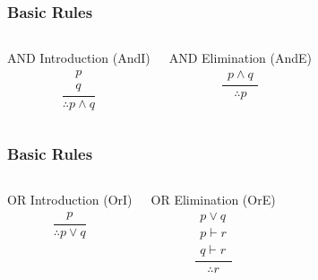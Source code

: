 \documentclass[dvipsnames]{beamer}
\begin{document}
\begin{frame}
  \frametitle{Basic Rules}

  \begin{columns}[t]
    \begin{block}{AND Introduction (AndI)}
      \[
      \frac
        {
          \begin{array}{c}
            p\\
            q
          \end{array}
        }
        {
          \therefore p \wedge q
        }
      \]
    \end{block}

    \pause
    \begin{block}{AND Elimination (AndE)}
    \[
    \frac
      {
        \begin{array}{c}
          p \wedge q
        \end{array}
      }
      {
        \therefore p
      }
    \]
    \end{block}
  \end{columns}
\end{frame}

\begin{frame}
  \frametitle{Basic Rules}

  \begin{columns}[t]
    \begin{block}{OR Introduction (OrI)}
      \[
      \frac
        {
          \begin{array}{c}
            p
          \end{array}
        }
        {
          \therefore p \vee q
        }
      \]
    \end{block}

    \pause
    \begin{block}{OR Elimination (OrE)}
    \[
    \frac
      {
        \begin{array}{c}
          p \vee q\\
          p \vdash r\\
          q \vdash r
        \end{array}
      }
      {
        \therefore r
      }
    \]
    \end{block}
  \end{columns}
\end{frame}
\end{document}
